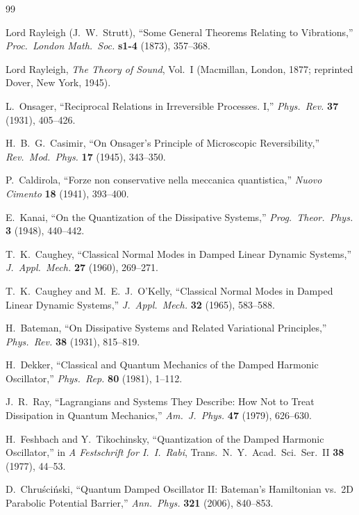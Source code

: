 \documentclass[12pt]{book}
\theoremstyle{definition}
\theoremstyle{remark}
\begin{document}
\begin{thebibliography}{99}

 Lord Rayleigh (J.\ W.\ Strutt), ``Some General Theorems Relating to Vibrations,'' \emph{Proc.\ London Math.\ Soc.} \textbf{s1-4} (1873), 357--368.

 Lord Rayleigh, \emph{The Theory of Sound}, Vol.\ I (Macmillan, London, 1877; reprinted Dover, New York, 1945).

 L.\ Onsager, ``Reciprocal Relations in Irreversible Processes. I,'' \emph{Phys.\ Rev.} \textbf{37} (1931), 405--426.

 H.\ B.\ G.\ Casimir, ``On Onsager's Principle of Microscopic Reversibility,'' \emph{Rev.\ Mod.\ Phys.} \textbf{17} (1945), 343--350.

 P.\ Caldirola, ``Forze non conservative nella meccanica quantistica,'' \emph{Nuovo Cimento} \textbf{18} (1941), 393--400.

 E.\ Kanai, ``On the Quantization of the Dissipative Systems,'' \emph{Prog.\ Theor.\ Phys.} \textbf{3} (1948), 440--442.

 T.\ K.\ Caughey, ``Classical Normal Modes in Damped Linear Dynamic Systems,'' \emph{J.\ Appl.\ Mech.} \textbf{27} (1960), 269--271.

 T.\ K.\ Caughey and M.\ E.\ J.\ O'Kelly, ``Classical Normal Modes in Damped Linear Dynamic Systems,'' \emph{J.\ Appl.\ Mech.} \textbf{32} (1965), 583--588.

 H.\ Bateman, ``On Dissipative Systems and Related Variational Principles,'' \emph{Phys.\ Rev.} \textbf{38} (1931), 815--819.

 H.\ Dekker, ``Classical and Quantum Mechanics of the Damped Harmonic Oscillator,'' \emph{Phys.\ Rep.} \textbf{80} (1981), 1--112.

 J.\ R.\ Ray, ``Lagrangians and Systems They Describe: How Not to Treat Dissipation in Quantum Mechanics,'' \emph{Am.\ J.\ Phys.} \textbf{47} (1979), 626--630.

 H.\ Feshbach and Y.\ Tikochinsky, ``Quantization of the Damped Harmonic Oscillator,'' in \emph{A Festschrift for I.\ I.\ Rabi}, Trans.\ N.\ Y.\ Acad.\ Sci.\ Ser.\ II \textbf{38} (1977), 44--53.

 D.\ Chru\'sci\'nski, ``Quantum Damped Oscillator II: Bateman's Hamiltonian vs.\ 2D Parabolic Potential Barrier,'' \emph{Ann.\ Phys.} \textbf{321} (2006), 840--853.


\end{thebibliography}
\end{document}
